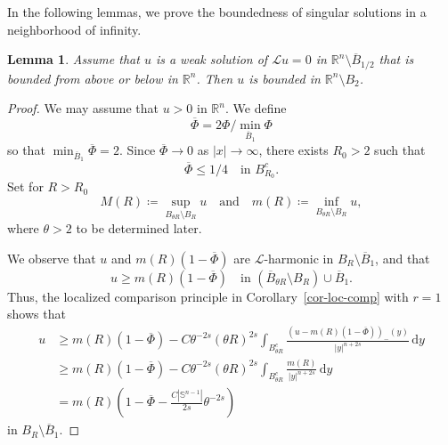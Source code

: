 \documentclass[11pt]{amsart}
\theoremstyle{plain}
\newtheorem{lemma}[theorem]{Lemma}
\theoremstyle{definition}
\numberwithin{equation}{section}
\begin{document}
In the following lemmas, we prove the boundedness of singular solutions in a neighborhood of infinity.

\begin{lemma}\label{lem-bdd}
Assume that $u$ is a weak solution of $\mathcal{L}u=0$ in $\mathbb{R}^n \setminus \overline{B}_{1/2}$ that is bounded from above or below in $\mathbb{R}^n$. Then $u$ is bounded in $\mathbb{R}^n \setminus B_2$.
\end{lemma}



\begin{proof}
We may assume that $u>0$ in $\mathbb{R}^n$. We define
\begin{equation*}
\overline{\Phi} =2\Phi / \min_{\overline{B}_1}\Phi
\end{equation*}
so that $\min_{\overline{B}_1} \overline{\Phi}=2$. Since $\overline{\Phi} \to 0$ as $|x| \to \infty$, there exists $R_0 > 2$ such that
\begin{equation}\label{eq-Gamma-R0}
    \overline{\Phi} \leq 1/4 \quad\text{in }B_{R_0}^c.
\end{equation}
Set for $R > R_0$
\begin{equation*}
    M(R) \coloneqq \sup_{B_{\theta R} \setminus B_{R}} u \quad\text{and}\quad m(R) \coloneqq \inf_{B_{\theta R} \setminus B_{R}} u,
\end{equation*}
where $\theta>2$ to be determined later.

We observe that $u$ and $m(R)(1-\overline{\Phi})$ are $\mathcal{L}$-harmonic in $B_R \setminus \overline{B}_1$, and that
\begin{equation*}
    u \geq m(R)(1-\overline{\Phi}) \quad\text{in }(\overline{B}_{\theta R} \setminus B_{R}) \cup \overline{B}_1.
\end{equation*}
Thus, the localized comparison principle in Corollary~\ref{cor-loc-comp} with $r=1$ shows that
\begin{align*}
    u
    &\geq m(R)(1-\overline{\Phi}) - C \theta^{-2s} (\theta R)^{2s} \int_{B_{\theta R}^c} \frac{(u-m(R)(1-\overline{\Phi}))_-(y)}{|y|^{n+2s}} \,\mathrm{d}y \\
    &\geq m(R)(1-\overline{\Phi}) - C \theta^{-2s} (\theta R)^{2s} \int_{B_{\theta R}^c} \frac{m(R)}{|y|^{n+2s}} \,\mathrm{d}y \\
    &= m(R)\left(1-\overline{\Phi}-\frac{C|\mathbb{S}^{n-1}|}{2s} \theta^{-2s} \right)
\end{align*}
in $B_{R} \setminus \overline{B}_1$.


\end{proof}
\end{document}
